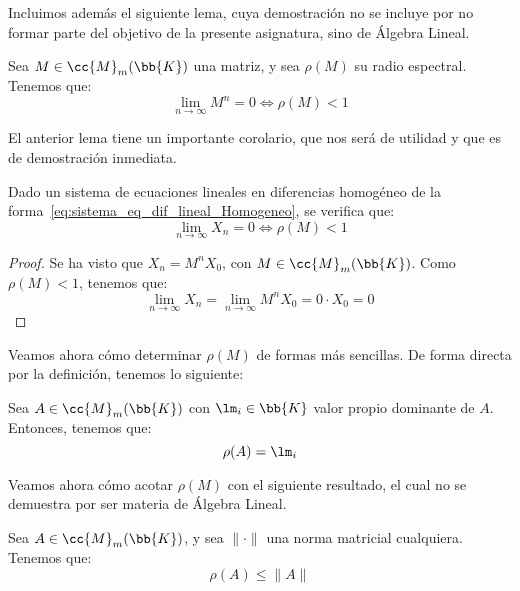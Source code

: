 Incluimos además el siguiente lema, cuya demostración no se incluye por no formar parte del objetivo de la presente asignatura, sino de Álgebra Lineal.
\begin{lema}
    Sea $M\in \cc{M}_m(\bb{K})$ una matriz, y sea $\rho(M)$ su radio espectral. Tenemos que:
    \begin{equation*}
        \lim_{n\to \infty} M^n = 0 \Longleftrightarrow \rho(M)<1
    \end{equation*}
\end{lema}

El anterior lema tiene un importante corolario, que nos será de utilidad y que es de demostración inmediata.
\begin{coro}
    Dado un sistema de ecuaciones lineales en diferencias homogéneo  de la forma~\ref{eq:sistema_eq_dif_lineal_Homogeneo}, se verifica que:
    \begin{equation*}
        \lim_{n\to \infty}X_n = 0\Longleftrightarrow \rho(M)<1
    \end{equation*}
    \begin{proof}
        Se ha visto que $X_n=M^nX_0$, con $M\in \cc{M}_m(\bb{K})$. Como $\rho(M)<1$, tenemos que:
        \begin{equation*}
            \lim_{n\to \infty}X_n = \lim_{n\to \infty} M^nX_0 = 0\cdot X_0=0
        \end{equation*}
    \end{proof}
\end{coro}

Veamos ahora cómo determinar $\rho(M)$ de formas más sencillas. De forma directa por la definición, tenemos lo siguiente:
\begin{observacion}
    Sea $A\in \cc{M}_m(\bb{K})$ con $\lm_i\in \bb{K}$ valor propio dominante de $A$. Entonces, tenemos que:
    \begin{equation*}
        \rho(A)=\lm_i
    \end{equation*}
\end{observacion}

Veamos ahora cómo acotar $\rho(M)$ con el siguiente resultado, el cual no se demuestra por ser materia de Álgebra Lineal.
\begin{prop}
    Sea $A\in \cc{M}_m(\bb{K})$, y sea $\|\cdot \|$ una norma matricial cualquiera. Tenemos que:
    \begin{equation*}
        \rho(A) \leq \|A\|
    \end{equation*}
\end{prop}

